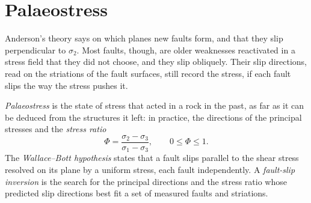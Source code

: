 \begin{omfigure}

\par{}\label{fig:b3:structural-analysis:flinn}
\end{omfigure}

\section{Palaeostress}\label{sec:b3:structural-analysis:palaeostress}

Anderson's theory says on which planes new faults form, and that they slip
perpendicular to $\sigma_2$. Most faults, though, are older weaknesses
reactivated in a stress field that they did not choose, and they slip
obliquely. Their slip directions, read on the striations of the fault
surfaces, still record the stress, if each fault slips the way the stress
pushes it.

\begin{definition}\label{def:b3:structural-analysis:palaeostress}
\emph{Palaeostress} is the state of stress that acted in
a rock in the past, as far as it can be deduced from the structures it left:
in practice, the directions of the principal stresses and the
\emph{stress ratio}
\[
  \Phi = \frac{\sigma_2 - \sigma_3}{\sigma_1 - \sigma_3}, \qquad 0 \le \Phi
  \le 1 .
\]
The \emph{Wallace--Bott hypothesis} states
that a fault slips parallel to the shear stress resolved on its plane by a
uniform stress, each fault independently. A \emph{fault-slip
inversion} is the search for the principal
directions and the stress ratio whose predicted slip directions best fit a set
of measured faults and striations.
\end{definition}

